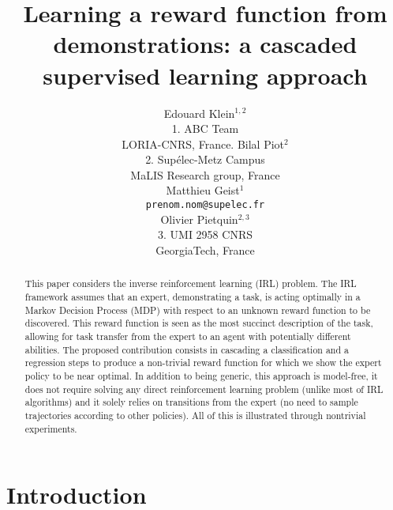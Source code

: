 \documentclass{article} %
\title{Learning a reward function from demonstrations: a cascaded supervised
learning approach}
\author{Edouard Klein$^{1,2}$\\
 1. ABC Team\\
 LORIA-CNRS, France.
\And Bilal Piot$^{2}$\\
 2. Supélec-Metz Campus\\
 MaLIS Research group, France\\
\And Matthieu Geist$^1$\\
\texttt{prenom.nom@supelec.fr}\\
\And Olivier Pietquin$^{2,3}$\\
3. UMI 2958 CNRS\\
GeorgiaTech, France
}
\newcommand{\0}{\mathbf{0}}
\newcommand{\1}{\mathbf{1}}
\begin{document}
\maketitle              %
\begin{abstract}
This paper considers the inverse reinforcement learning (IRL) problem. The IRL framework assumes that an expert, demonstrating a task, is acting optimally in a Markov Decision Process (MDP) with respect to an unknown reward function to be discovered. This reward function is seen as the most succinct description of the task, allowing for task transfer from the expert to an agent with potentially different abilities. The proposed contribution consists in cascading a classification and a regression steps to produce a non-trivial reward function for which we show the expert policy to be near optimal. In addition to being generic, this approach is model-free, it does not require solving any direct reinforcement learning problem (unlike most of IRL algorithms) and it solely relies on transitions from the expert (no need to sample trajectories according to other policies). All of this is illustrated through nontrivial experiments.
\end{abstract}

\section{Introduction}
\end{document}
